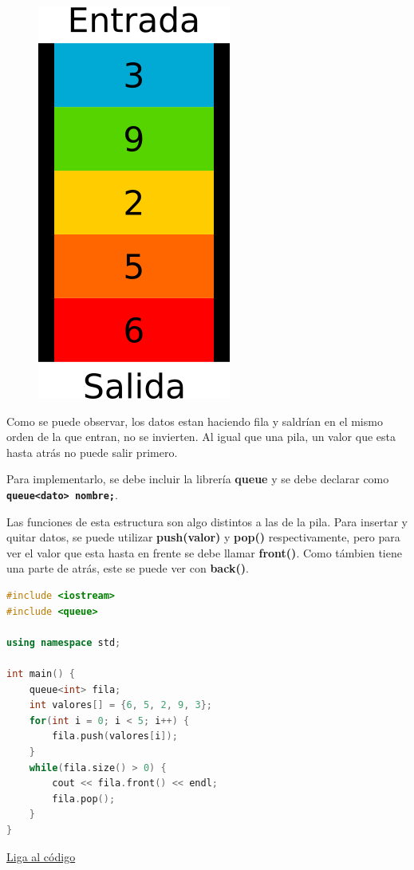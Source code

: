 \documentclass{article}
\begin{document}
\begin{figure}[H]
    \centering
    \includegraphics[width=0.1\paperwidth]{fila}
\end{figure}

Como se puede observar, los datos estan haciendo fila y saldrían en el mismo orden de la que entran, no se invierten. Al igual que una pila, un valor que esta hasta atrás no puede salir primero.

Para implementarlo, se debe incluir la librería \textbf{queue} y se debe declarar como \textbf{\lstinline{queue<dato> nombre;}}.

Las funciones de esta estructura son algo distintos a las de la pila. Para insertar y quitar datos, se puede utilizar \textbf{push(valor)} y \textbf{pop()} respectivamente, pero para ver el valor que esta hasta en frente se debe llamar \textbf{front()}. Como támbien tiene una parte de atrás, este se puede ver con \textbf{back()}.

\begin{lstlisting}[language=C++, caption=Filas]
#include <iostream>
#include <queue>

using namespace std;

int main() {
    queue<int> fila;
    int valores[] = {6, 5, 2, 9, 3};
    for(int i = 0; i < 5; i++) {
        fila.push(valores[i]);
    }
    while(fila.size() > 0) {
        cout << fila.front() << endl;
        fila.pop();
    }
}
\end{lstlisting}
\href{https://repl.it/@Jamesscn/Haciendo-filas}{Liga al código} \\
\end{document}
